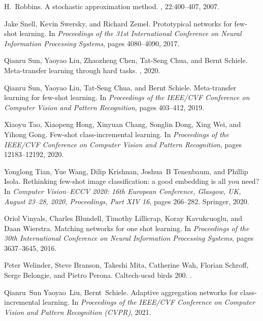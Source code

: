 \documentclass{article}
\begin{document}
\begin{thebibliography}{10}
H.~Robbins.
\newblock A stochastic approximation method.
, 22:400--407, 2007.

Jake Snell, Kevin Swersky, and Richard Zemel.
\newblock Prototypical networks for few-shot learning.
\newblock In {\em Proceedings of the 31st International Conference on Neural
  Information Processing Systems}, pages 4080--4090, 2017.

Qianru Sun, Yaoyao Liu, Zhaozheng Chen, Tat-Seng Chua, and Bernt Schiele.
\newblock Meta-transfer learning through hard tasks.
,
  2020.

Qianru Sun, Yaoyao Liu, Tat-Seng Chua, and Bernt Schiele.
\newblock Meta-transfer learning for few-shot learning.
\newblock In {\em Proceedings of the IEEE/CVF Conference on Computer Vision and
  Pattern Recognition}, pages 403--412, 2019.

Xiaoyu Tao, Xiaopeng Hong, Xinyuan Chang, Songlin Dong, Xing Wei, and Yihong
  Gong.
\newblock Few-shot class-incremental learning.
\newblock In {\em Proceedings of the IEEE/CVF Conference on Computer Vision and
  Pattern Recognition}, pages 12183--12192, 2020.

Yonglong Tian, Yue Wang, Dilip Krishnan, Joshua~B Tenenbaum, and Phillip Isola.
\newblock Rethinking few-shot image classification: a good embedding is all you
  need?
\newblock In {\em Computer Vision--ECCV 2020: 16th European Conference,
  Glasgow, UK, August 23--28, 2020, Proceedings, Part XIV 16}, pages 266--282.
  Springer, 2020.

Oriol Vinyals, Charles Blundell, Timothy Lillicrap, Koray Kavukcuoglu, and Daan
  Wierstra.
\newblock Matching networks for one shot learning.
\newblock In {\em Proceedings of the 30th International Conference on Neural
  Information Processing Systems}, pages 3637--3645, 2016.

Peter Welinder, Steve Branson, Takeshi Mita, Catherine Wah, Florian Schroff,
  Serge Belongie, and Pietro Perona.
\newblock Caltech-ucsd birds 200.
.

Qianru~Sun Yaoyao~Liu, Bernt~Schiele.
\newblock Adaptive aggregation networks for class-incremental learning.
\newblock In {\em Proceedings of the IEEE/CVF Conference on Computer Vision and
  Pattern Recognition (CVPR)}, 2021.


\end{thebibliography}
\end{document}

